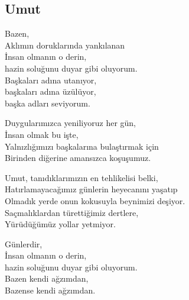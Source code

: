 \subsection{Umut}

Bazen, \\
Aklımın doruklarında yankılanan \\
İnsan olmanın o derin, \\
hazin soluğunu duyar gibi oluyorum. \\
Başkaları adına utanıyor, \\
başkaları adına üzülüyor, \\
başka adları seviyorum.

\noindent\newline
Duygularımızca yeniliyoruz her gün, \\
İnsan olmak bu işte, \\
Yalnızlığımızı başkalarına bulaştırmak için \\
Birinden diğerine amansızca koşuşumuz.

\noindent\newline
Umut, tanıdıklarımızın en tehlikelisi belki, \\
Hatırlamayacağımız günlerin heyecanını yaşatıp \\
Olmadık yerde onun kokusuyla beynimizi deşiyor. \\
Saçmalıklardan türettiğimiz dertlere, \\
Yürüdüğümüz yollar yetmiyor.

\noindent\newline
Günlerdir, \\
İnsan olmanın o derin, \\
hazin soluğunu duyar gibi oluyorum. \\
Bazen kendi ağzımdan, \\
Bazense kendi ağzımdan.